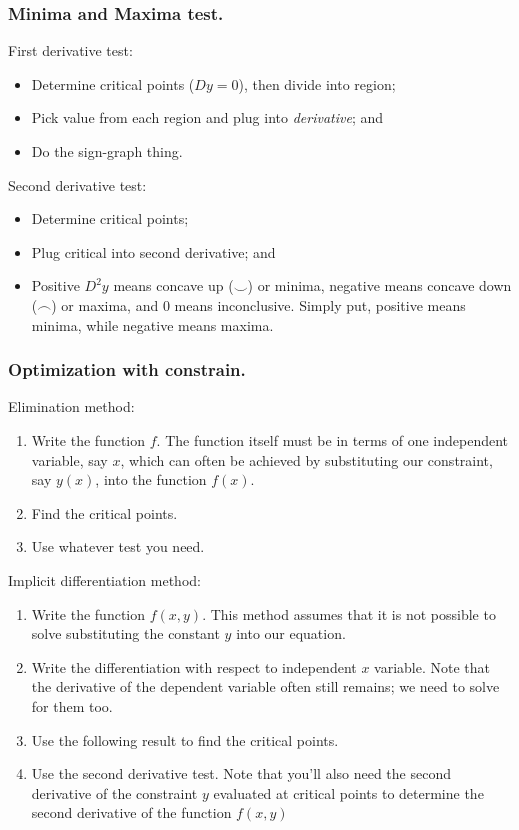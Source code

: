 \documentclass[../../../main.tex]{subfiles}
\begin{document}
\subsubsection{Minima and Maxima test.} First derivative test:
\begin{itemize}
    \item Determine critical points ($ Dy=0$), then divide into region;
    \item Pick value from each region and plug into \emph{derivative}; and
    \item Do the sign-graph thing.
\end{itemize}
Second derivative test:
\begin{itemize}
    \item Determine critical points;
    \item Plug critical into second derivative; and
    \item Positive $ D^2y$ means concave up ($\smile$) or minima, negative means concave down ($\frown$) or maxima, and 0 means inconclusive. Simply put, positive means minima, while negative means maxima.
\end{itemize}

\subsubsection{Optimization with constrain.} Elimination method:
\begin{enumerate}
    \item Write the function $f$. The function itself must be in terms of one independent variable, say $x$, which can often be achieved by substituting our constraint, say $y(x)$, into the function $f(x)$.
    \item Find the critical points.
    \item Use whatever test you need.
\end{enumerate}
Implicit differentiation method:
\begin{enumerate}
    \item Write the function $f(x,y)$. This method assumes that it is not possible to solve substituting the constant $y$ into our equation.
    \item Write the differentiation with respect to independent $x$ variable. Note that the derivative of the dependent variable often still remains; we need to solve for them too.
    \item Use the following result to find the critical points.
    \item Use the second derivative test. Note that you'll also need the second derivative of the constraint $y$ evaluated at critical points to determine the second derivative of the function $f(x,y)$
\end{enumerate}
\end{document}
